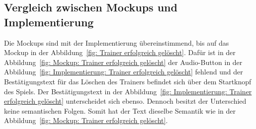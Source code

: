 \subsection{Vergleich zwischen Mockups und Implementierung}\label{subsec:vergleich-zwischen-mockups-und-implementierung-trainer-settings}
Die Mockups sind mit der Implementierung übereinstimmend, bis auf das Mockup in der Abbildung~\ref{fig: Trainer erfolgreich gelöscht}. Dafür ist in der Abbildung~\ref{fig: Mockup: Trainer erfolgreich gelöscht} der Audio-Button in der Abbildung~\ref{fig: Implementierung: Trainer erfolgreich gelöscht} fehlend und der Bestätigungstext für das Löschen des Trainers befindet sich über dem Startknopf des Spiels. Der Bestätigungstext in der Abbildung~\ref{fig: Implementierung: Trainer erfolgreich gelöscht} unterscheidet sich ebenso. Dennoch besitzt der Unterschied keine semantischen Folgen. Somit hat der Text dieselbe Semantik wie in der Abbildung~\ref{fig: Mockup: Trainer erfolgreich gelöscht}. 
